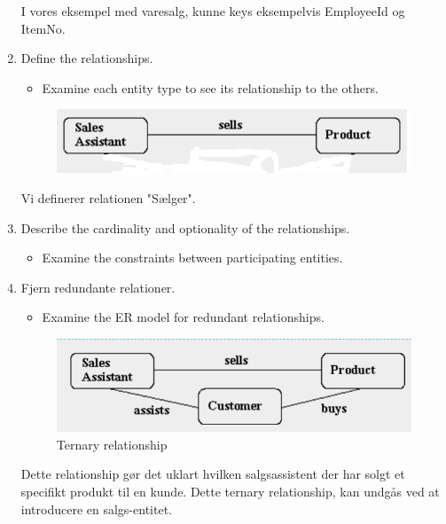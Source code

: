 \begin{enumerate}
	I vores eksempel med varesalg, kunne keys eksempelvis EmployeeId og ItemNo.
	
	\item Define the relationships.
	
	\begin{itemize}
		\item Examine each entity type to see its relationship to the others.
	\end{itemize}
	
	\begin{figure}[H]
		\centering
		\includegraphics[width=0.7\linewidth]{figs/spm1/salesProductRelation.png}
		\caption{}
		\label{fig:salesProductRelation}
	\end{figure}
	
	Vi definerer relationen "Sælger".

	
	\item Describe the cardinality and optionality of the relationships.
	
	\begin{itemize}
		\item Examine the constraints between participating entities.
	\end{itemize}
	
	\item Fjern redundante relationer.
	
	\begin{itemize}
		\item Examine the ER model for redundant relationships.
	\end{itemize}
	
	\begin{figure}[H]
		\centering
		\includegraphics[width=0.7\linewidth]{figs/spm1/ternaryRelation.PNG}
		\caption{Ternary relationship}
		\label{fig:ternaryRelation}
	\end{figure}
	
	Dette relationship gør det uklart hvilken salgsassistent der har solgt et specifikt produkt til en kunde.
	Dette ternary relationship, kan undgås ved at introducere en salgs-entitet.
	

\end{enumerate}
